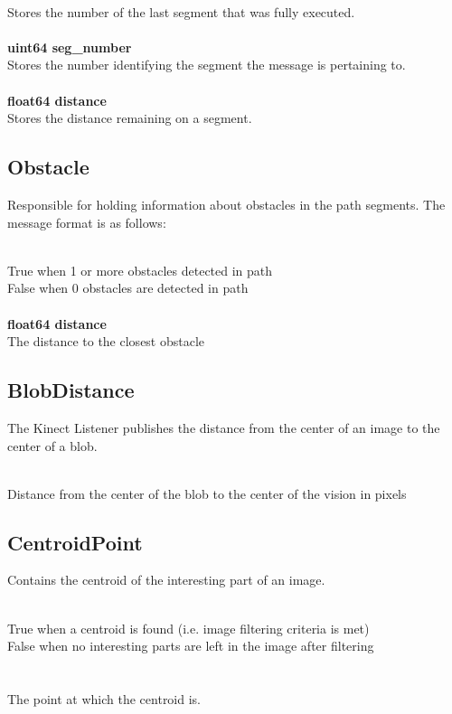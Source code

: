 \\
\indent Stores the number of the last segment that was fully executed.\\
\\
{\bf uint64 seg\_number}\\
\indent Stores the number identifying the segment the message is
pertaining to.\\
\\
{\bf float64 distance}\\
\indent Stores the distance remaining on a segment.\\

\subsection{Obstacle}

Responsible for holding information about obstacles in the path
segments.  The message format is as follows:

\\
\indent True when 1 or more obstacles detected in path\\
\indent False when 0 obstacles are detected in path\\
\\
{\bf float64 distance}\\
\indent The distance to the closest obstacle\\

\subsection{BlobDistance}
The Kinect Listener publishes the distance from the center of an image
to the center of a blob.

\\
\indent Distance from the center of the blob to the center of the vision in pixels\\

\subsection{CentroidPoint}
Contains the centroid of the interesting part of an image.

\\
\indent True when a centroid is found (i.e. image filtering criteria is met)\\
\indent False when no interesting parts are left in the image after filtering\\
\\
\\
\indent The point at which the centroid is.\\

